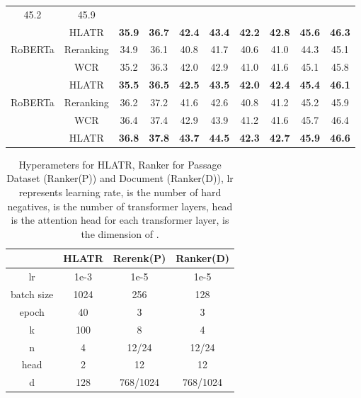 \documentclass[11pt]{article}
\begin{document}
\begin{table*}[t]
{\begin{tabular}{@{}cccccccccc@{}}
  45.2 &
  45.9 \\
\multicolumn{1}{c|}{} &
  \multicolumn{1}{c|}{HLATR} &
  \textbf{35.9} &
  \multicolumn{1}{c|}{\textbf{36.7}} &
  \textbf{42.4} &
  \multicolumn{1}{c|}{\textbf{43.4}} &
  \textbf{42.2} &
  \multicolumn{1}{c|}{\textbf{42.8}} &
  \textbf{45.6} &
  \textbf{46.3} \\ \midrule
\multicolumn{1}{c|}{\multirow{3}{*}{RoBERTa}} &
  \multicolumn{1}{c|}{Reranking} &
  34.9 &
  \multicolumn{1}{c|}{36.1} &
  40.8 &
  \multicolumn{1}{c|}{41.7} &
  40.6 &
  \multicolumn{1}{c|}{41.0} &
  44.3 &
  45.1 \\
\multicolumn{1}{c|}{} &
  \multicolumn{1}{c|}{WCR} &
  35.2 &
  \multicolumn{1}{c|}{36.3} &
  42.0 &
  \multicolumn{1}{c|}{42.9} &
  41.0 &
  \multicolumn{1}{c|}{41.6} &
  45.1 &
  45.8 \\
\multicolumn{1}{c|}{} &
  \multicolumn{1}{c|}{HLATR} &
  \textbf{35.5} &
  \multicolumn{1}{c|}{\textbf{36.5}} &
  \textbf{42.5} &
  \multicolumn{1}{c|}{\textbf{43.5}} &
  \textbf{42.0} &
  \multicolumn{1}{c|}{\textbf{42.4}} &
  \textbf{45.4} &
  \textbf{46.1} \\ \midrule
\multicolumn{1}{c|}{\multirow{3}{*}{RoBERTa}} &
  \multicolumn{1}{c|}{Reranking} &
  36.2 &
  \multicolumn{1}{c|}{37.2} &
  41.6 &
  \multicolumn{1}{c|}{42.6} &
  40.8 &
  \multicolumn{1}{c|}{41.2} &
  45.2 &
  45.9 \\
\multicolumn{1}{c|}{} &
  \multicolumn{1}{c|}{WCR} &
  36.4 &
  \multicolumn{1}{c|}{37.4} &
  42.9 &
  \multicolumn{1}{c|}{43.9} &
  41.2 &
  \multicolumn{1}{c|}{41.6} &
  45.7 &
  46.4 \\
\multicolumn{1}{c|}{} &
  \multicolumn{1}{c|}{HLATR} &
  \textbf{36.8} &
  \multicolumn{1}{c|}{\textbf{37.8}} &
  \textbf{43.7} &
  \multicolumn{1}{c|}{\textbf{44.5}} &
  \textbf{42.3} &
  \multicolumn{1}{c|}{\textbf{42.7}} &
  \textbf{45.9} &
  \textbf{46.6} \\ \bottomrule
\end{tabular}
}
\end{table*}

\begin{table}[]
\centering
\caption{Hyperameters for HLATR, Ranker for Passage Dataset (Ranker(P)) and Document (Ranker(D)), lr represents learning rate,  is the number of hard negatives,  is the number of transformer layers, head is the attention head for each transformer layer,  is the dimension of .}
\label{tab:hyper}
\begin{tabular}{c|c|c|c}
\toprule
 & HLATR & Rerenk(P) & Ranker(D)\\ \midrule
lr             & 1e-3 & 1e-5 & 1e-5\\
batch size     & 1024 & 256 & 128\\
epoch          & 40   & 3 & 3\\ 
k              & 100  & 8 & 4 \\
n              & 4    & 12/24 & 12/24\\
head           & 2    & 12 & 12\\
d              & 128  & 768/1024 & 768/1024 \\ \bottomrule
\end{tabular}
\end{table}
\end{document}
